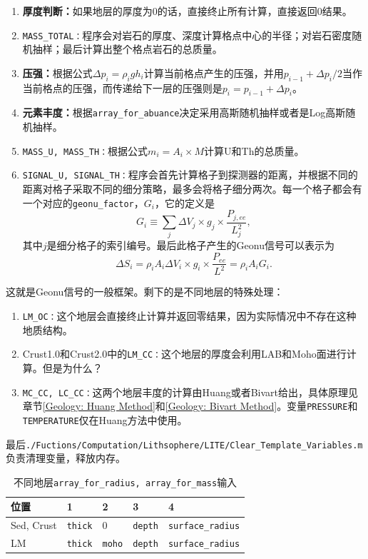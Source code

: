 				\begin{enumerate}
					\item \textbf{厚度判断：}如果地层的厚度为$0$的话，直接终止所有计算，直接返回$0$结果。
					\item \texttt{MASS\_TOTAL：}程序会对岩石的厚度、深度计算格点中心的半径；对岩石密度随机抽样；最后计算出整个格点岩石的总质量。
					\item \textbf{压强：}根据公式$\Delta p_i = \rho_i g h_i$计算当前格点产生的压强，并用$p_{i - 1} + \Delta p_i/2$当作当前格点的压强，而传递给下一层的压强则是$p_i = p_{i -1 } + \Delta p_i$。
					\item \textbf{元素丰度：}根据\texttt{array\_for\_abuance}决定采用高斯随机抽样或者是Log高斯随机抽样。
					\item \texttt{MASS\_U, MASS\_TH：}根据公式$m_i = A_i \times M$计算U和Th的总质量。
					\item \texttt{SIGNAL\_U, SIGNAL\_TH：}程序会首先计算格子到探测器的距离，并根据不同的距离对格子采取不同的细分策略，最多会将格子细分两次。每一个格子都会有一个对应的\texttt{geonu\_factor}，$G_i$，它的定义是
						\begin{equation}
							G_i
							\equiv \sum_j \Delta V_j \times g_j \times \frac{P_{j, ee}}{L_j^2},
						\end{equation}
					其中$j$是细分格子的索引编号。最后此格子产生的Geonu信号可以表示为
						\begin{equation}
							\Delta S_i
							= \rho_i A_i \Delta V_i \times g_i \times \frac{P_{ee}}{L^2}
							= \rho_i A_i G_i.
						\end{equation}
				\end{enumerate}
			这就是Geonu信号的一般框架。剩下的是不同地层的特殊处理：
				\begin{enumerate}
					\item \texttt{LM\_OC：}这个地层会直接终止计算并返回零结果，因为实际情况中不存在这种地质结构。
					\item Crust1.0和Crust2.0中的\texttt{LM\_CC：}这个地层的厚度会利用LAB和Moho面进行计算。但是为什么？
					\item \texttt{MC\_CC, LC\_CC：}这两个地层丰度的计算由Huang或者Bivart给出，具体原理见章节\ref{Geology: Huang Method}和\ref{Geology: Bivart Method}。变量\texttt{PRESSURE}和\texttt{TEMPERATURE}仅在Huang方法中使用。
				\end{enumerate}
			最后\texttt{./Fuctions/Computation/Lithsophere/LITE/Clear\_Template\_Variables.m}负责清理变量，释放内存。
				\begin{table}[H]
					\centering
					\caption{不同地层\texttt{array\_for\_radius, array\_for\_mass}输入}
					\begin{tabular}{p{3cm}|p{2cm}p{2cm}p{2cm}p{3cm}}
						\hline
						\hline
						位置 & 1 & 2 & 3 & 4\\
						\hline
						Sed, Crust & \texttt{thick} & $0$ & \texttt{depth} & \texttt{surface\_radius}\\
						\hline
						LM & \texttt{thick} & \texttt{moho} & \texttt{depth} & \texttt{surface\_radius}\\
						\hline
						\hline
						\hline
					\end{tabular}
				\end{table}
